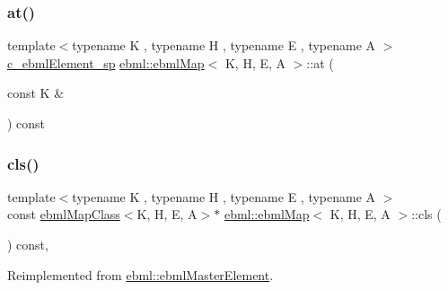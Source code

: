 \mbox{\label{classebml_1_1ebmlMap_a509ec9c5ff36ce6b448f475267b6269e}} 
\subsubsection{\texorpdfstring{at()}{at()}\hspace{0.1cm}{\footnotesize\ttfamily [2/2]}}
{\footnotesize\ttfamily template$<$typename K , typename H , typename E , typename A $>$ \\
\mbox{\hyperlink{namespaceebml_a2deef4e8071531b32e3533f1bf978917}{c\+\_\+ebml\+Element\+\_\+sp}} \mbox{\hyperlink{classebml_1_1ebmlMap}{ebml\+::ebml\+Map}}$<$ K, H, E, A $>$\+::at (\begin{DoxyParamCaption}\item[{const K \&}]{ }\end{DoxyParamCaption}) const}

\mbox{\label{classebml_1_1ebmlMap_a44f835be40d70d8425b8e08fbe0ce77f}} 
\subsubsection{\texorpdfstring{cls()}{cls()}}
{\footnotesize\ttfamily template$<$typename K , typename H , typename E , typename A $>$ \\
const \mbox{\hyperlink{classebml_1_1ebmlMapClass}{ebml\+Map\+Class}}$<$K, H, E, A$>$$\ast$ \mbox{\hyperlink{classebml_1_1ebmlMap}{ebml\+::ebml\+Map}}$<$ K, H, E, A $>$\+::cls (\begin{DoxyParamCaption}{ }\end{DoxyParamCaption}) const\hspace{0.3cm}{\ttfamily [override]}, {\ttfamily [virtual]}}



Reimplemented from \mbox{\hyperlink{classebml_1_1ebmlMasterElement_a4073fb3f7ce3dda153384821714df29e}{ebml\+::ebml\+Master\+Element}}.

\mbox{\label{classebml_1_1ebmlMap_a34c5d8ef796df9ea13907cd5d75f33a4}} 
